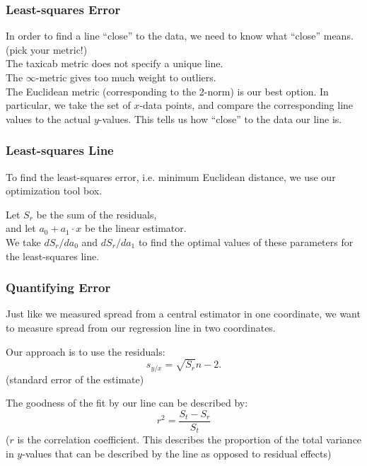 \documentclass[12pt]{beamer}
\theoremstyle{definition}
\begin{document}
\begin{frame}
\frametitle{Least-squares Error}

In order to find a line ``close'' to the data, we need to know
what ``close'' means. (pick your metric!) \\[5mm]

The taxicab metric does not specify a unique line. \\
The $\infty$-metric gives too much weight to outliers.\\

The Euclidean metric (corresponding to the 2-norm) is our best
option. In particular, we take the set of $x$-data points, and
compare the corresponding line values to the actual $y$-values.
This tells us how ``close'' to the data our line is.
\end{frame}

\begin{frame}
\frametitle{Least-squares Line}

To find the least-squares error, i.e. minimum Euclidean
distance, we use our optimization tool box.

Let $S_r$ be the sum of the residuals,\\
and let $a_0 + a_1\cdot x$ be the linear estimator. \\[5mm]

We take $dS_r/da_0$ and $dS_r/da_1$ to find the optimal
values of these parameters for the least-squares line.
\end{frame}

\begin{frame}
\frametitle{Quantifying Error}
Just like we measured spread from a
central estimator in one coordinate, we want to measure
spread from our regression line in two coordinates.

Our approach is to use the residuals:
\[ s_{y/x} = \sqrt{S_r}{n-2}.\]
(standard error of the estimate)

The goodness of the fit by our line can be described by:
\[ r^2 = \dfrac{S_t - S_r}{S_t}\]
($r$ is the correlation coefficient. 
This describes the proportion of the total variance in $y$-values
that can be described by the line as opposed to residual
effects)
\end{frame}
\end{document}

